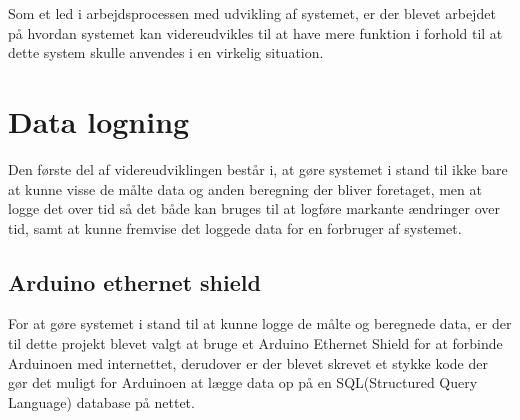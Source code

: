 Som et led i arbejdsprocessen med udvikling af systemet, er der blevet arbejdet på hvordan systemet kan videreudvikles til at have mere funktion i forhold til at dette system skulle anvendes i en virkelig situation.

\section{Data logning}
Den første del af videreudviklingen består i, at gøre systemet i stand til ikke bare at kunne visse de målte data og anden beregning der bliver foretaget, men at logge det over tid så det både kan bruges til at logføre markante ændringer over tid, samt at kunne fremvise det loggede data for en forbruger af systemet.

\subsection{Arduino ethernet shield}
For at gøre systemet i stand til at kunne logge de målte og beregnede data, er der til dette projekt blevet valgt at bruge et Arduino Ethernet Shield for at forbinde Arduinoen med internettet, derudover er der blevet skrevet et stykke kode der gør det muligt for Arduinoen at lægge data op på en SQL(Structured Query Language) database på nettet.
\newline

